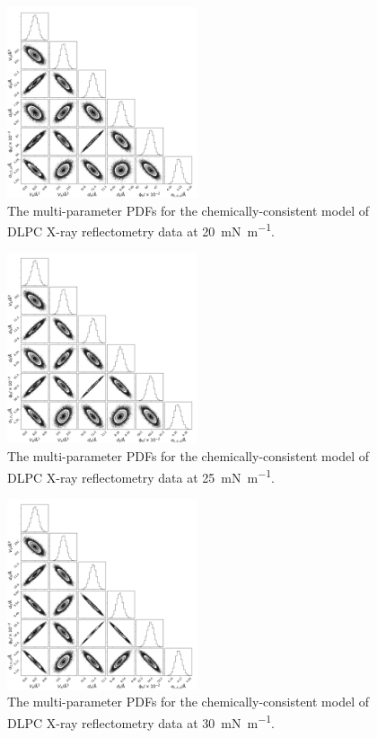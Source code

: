 \documentclass[amsmath,amssymb,superscriptaddress]{revtex4-1}
\begin{document}
\begin{figure}[H]
	\centering
	\includegraphics[width=0.50\textwidth]{figures/dlpc1_all_corner}
	\caption{The multi-parameter PDFs for the chemically-consistent model of DLPC X-ray reflectometry data at \SI{20}{\milli\newton\per\meter}.}
	\label{fig:dlpc1}
\end{figure}
\begin{figure}[H]
	\centering
	\includegraphics[width=0.50\textwidth]{figures/dlpc2_all_corner}
	\caption{The multi-parameter PDFs for the chemically-consistent model of DLPC X-ray reflectometry data at \SI{25}{\milli\newton\per\meter}.}
	\label{fig:dlpc2}
\end{figure}
\begin{figure}[H]
	\centering
	\includegraphics[width=0.50\textwidth]{figures/dlpc3_all_corner}
	\caption{The multi-parameter PDFs for the chemically-consistent model of DLPC X-ray reflectometry data at \SI{30}{\milli\newton\per\meter}.}
	\label{fig:dlpc3}
\end{figure}
\end{document}
